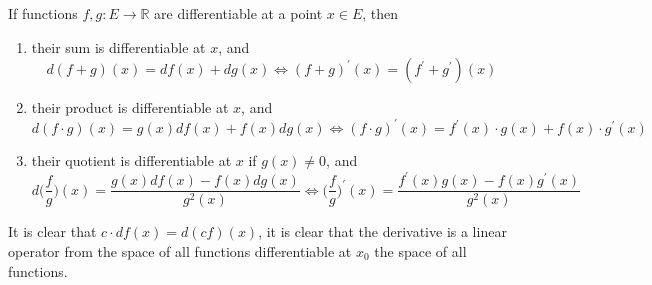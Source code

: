 \documentclass{article}
\begin{document}
    \begin{theorem}
    If functions $f, g: E \longrightarrow \mathbb{R}$ are differentiable at a point $x \in E$, then 
    \begin{enumerate}
      \item their sum is differentiable at $x$, and 
      \[d(f+g) (x) = df(x) + dg(x) \iff (f+g)^\prime (x) = (f^\prime + g^\prime) (x)\]
      \item their product is differentiable at $x$, and 
      \[d (f \cdot g) (x) = g(x) df(x) + f(x) dg(x) \iff (f \cdot g)^\prime (x) = f^\prime (x) \cdot g(x) + f(x) \cdot g^\prime (x)\]
      \item their quotient is differentiable at $x$ if $g(x) \neq 0$, and 
      \[d \Big( \frac{f}{g} \Big) (x) =  \frac{g(x) df(x) - f(x) dg(x)}{g^2 (x)} \iff \bigg(\frac{f}{g}\bigg)^\prime (x) = \frac{f^\prime (x) g(x) - f(x) g^\prime (x)}{g^2 (x)}\]
    \end{enumerate}
    It is clear that $c\cdot df(x) = d (cf)(x)$, it is clear that the derivative is a linear operator from the space of all functions differentiable at $x_0$ the space of all functions. 
    \end{theorem}
\end{document}

